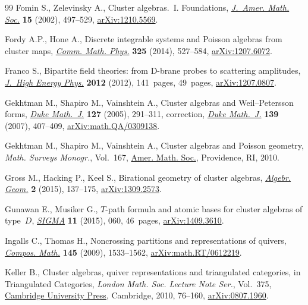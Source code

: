 \documentclass[10pt,a4paper]{amsart}
\numberwithin{equation}{section}
\begin{document}
\begin{thebibliography}{99}
Fomin S., Zelevinsky A., Cluster algebras.~{I}. {F}oundations, \href{https://doi.org/10.1090/S0894-0347-01-00385-X}{\textit{J.~Amer.
 Math. Soc.}} \textbf{15} (2002), 497--529, \href{https://arxiv.org/abs/1210.5569}{arXiv:1210.5569}.

Fordy A.P., Hone A., Discrete integrable systems and {P}oisson algebras from
 cluster maps, \href{https://doi.org/10.1007/s00220-013-1867-y}{\textit{Comm. Math. Phys.}} \textbf{325} (2014), 527--584,
 \href{https://arxiv.org/abs/1207.6072}{arXiv:1207.6072}.

Franco S., Bipartite field theories: from {D}-brane probes to scattering
 amplitudes, \href{https://doi.org/10.1007/JHEP11(2012)141}{\textit{J.~High Energy Phys.}} \textbf{2012} (2012), 141~pages,
 49~pages, \href{https://arxiv.org/abs/1207.0807}{arXiv:1207.0807}.

Gekhtman M., Shapiro M., Vainshtein A., Cluster algebras and
 {W}eil--{P}etersson forms, \href{https://doi.org/10.1215/S0012-7094-04-12723-X}{\textit{Duke Math.~J.}} \textbf{127} (2005),
 291--311, correction,
 \href{https://doi.org/10.1215/S0012-7094-07-13925-5}{\textit{Duke Math.~J.}}
 \textbf{139} (2007), 407--409, \href{https://arxiv.org/abs/math.QA/0309138}{arXiv:math.QA/0309138}.

Gekhtman M., Shapiro M., Vainshtein A., Cluster algebras and {P}oisson
 geometry, \textit{Math. Surveys Monogr.}, Vol.~167, \href{https://doi.org/10.1090/surv/167}{Amer. Math. Soc.},
 Providence, RI, 2010.

Gross M., Hacking P., Keel S., Birational geometry of cluster algebras,
 \href{https://doi.org/10.14231/AG-2015-007}{\textit{Algebr. Geom.}} \textbf{2} (2015), 137--175, \href{https://arxiv.org/abs/1309.2573}{arXiv:1309.2573}.

Gunawan E., Musiker G., {$T$}-path formula and atomic bases for cluster
 algebras of type~{$D$}, \href{https://doi.org/10.3842/SIGMA.2015.060}{\textit{SIGMA}} \textbf{11} (2015), 060, 46~pages,
 \href{https://arxiv.org/abs/1409.3610}{arXiv:1409.3610}.

Ingalls C., Thomas H., Noncrossing partitions and representations of quivers,
 \href{https://doi.org/10.1112/S0010437X09004023}{\textit{Compos. Math.}} \textbf{145} (2009), 1533--1562,
 \href{https://arxiv.org/abs/math.RT/0612219}{arXiv:math.RT/0612219}.

Keller B., Cluster algebras, quiver representations and triangulated
 categories, in Triangulated Categories, \textit{London Math. Soc. Lecture
 Note Ser.}, Vol.~375, \href{https://doi.org/10.1017/CBO9781139107075.004}{Cambridge University Press}, Cambridge, 2010, 76--160,
 \href{https://arxiv.org/abs/0807.1960}{arXiv:0807.1960}.


\end{thebibliography}
\end{document}
